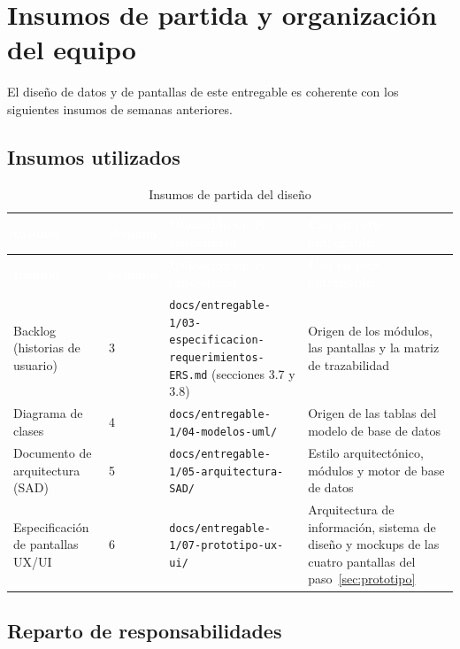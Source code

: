 \documentclass[11pt,a4paper]{article}
\newcommand{\cab}[1]{\textcolor{white}{\textbf{#1}}}
\begin{document}
\tableofcontents
\newpage

\section*{Insumos de partida y organización del equipo}

El diseño de datos y de pantallas de este entregable es coherente con los
siguientes insumos de semanas anteriores.

\subsection*{Insumos utilizados}

\begin{xltabular}{\linewidth}{|P{3.2cm}|P{1.5cm}|L|L|}
  \caption{Insumos de partida del diseño}\label{tab:insumos}\\
  \hline
  \cab{Insumo} & \cab{Semana} & \cab{Ubicación en el repositorio} & \cab{Uso en este entregable} \\ \hline
  \endfirsthead
  \hline
  \cab{Insumo} & \cab{Semana} & \cab{Ubicación en el repositorio} & \cab{Uso en este entregable} \\ \hline
  \endhead
  Backlog (historias de usuario) & 3 &
    \nolinkurl{docs/entregable-1/03-especificacion-requerimientos-ERS.md} (secciones 3.7 y 3.8) &
    Origen de los módulos, las pantallas y la matriz de trazabilidad \\ \hline
  Diagrama de clases & 4 &
    \nolinkurl{docs/entregable-1/04-modelos-uml/} &
    Origen de las tablas del modelo de base de datos \\ \hline
  Documento de arquitectura (SAD) & 5 &
    \nolinkurl{docs/entregable-1/05-arquitectura-SAD/} &
    Estilo arquitectónico, módulos y motor de base de datos \\ \hline
  Especificación de pantallas UX/UI & 6 &
    \nolinkurl{docs/entregable-1/07-prototipo-ux-ui/} &
    Arquitectura de información, sistema de diseño y mockups de las cuatro pantallas del
    paso~\ref{sec:prototipo} \\ \hline
\end{xltabular}

\subsection*{Reparto de responsabilidades}
\end{document}
